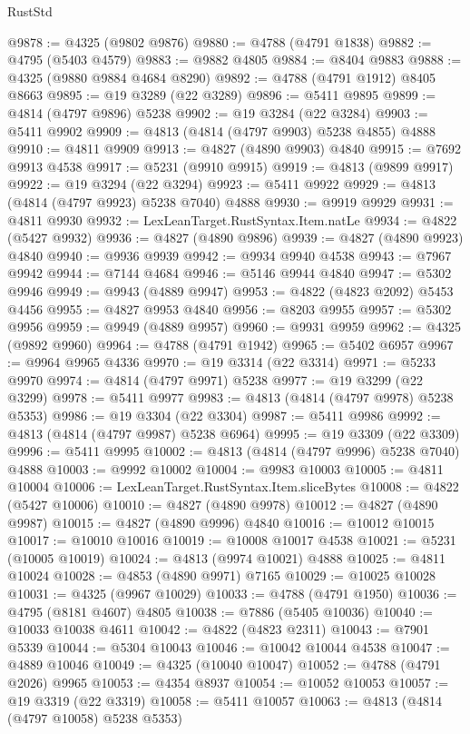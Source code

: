 \begin{lexlean}{RustStd}
\begin{coremodule}
@9878 := @4325 (@9802 @9876)
@9880 := @4788 (@4791 @1838)
@9882 := @4795 (@5403 @4579)
@9883 := @9882 @4805
@9884 := @8404 @9883
@9888 := @4325 (@9880 @9884 @4684 @8290)
@9892 := @4788 (@4791 @1912) @8405 @8663
@9895 := @19 @3289 (@22 @3289)
@9896 := @5411 @9895
@9899 := @4814 (@4797 @9896) @5238
@9902 := @19 @3284 (@22 @3284)
@9903 := @5411 @9902
@9909 := @4813 (@4814 (@4797 @9903) @5238 @4855) @4888
@9910 := @4811 @9909
@9913 := @4827 (@4890 @9903) @4840
@9915 := @7692 @9913 @4538
@9917 := @5231 (@9910 @9915)
@9919 := @4813 (@9899 @9917)
@9922 := @19 @3294 (@22 @3294)
@9923 := @5411 @9922
@9929 := @4813 (@4814 (@4797 @9923) @5238 @7040) @4888
@9930 := @9919 @9929
@9931 := @4811 @9930
@9932 := LexLeanTarget.RustSyntax.Item.natLe
@9934 := @4822 (@5427 @9932)
@9936 := @4827 (@4890 @9896)
@9939 := @4827 (@4890 @9923) @4840
@9940 := @9936 @9939
@9942 := @9934 @9940 @4538
@9943 := @7967 @9942
@9944 := @7144 @4684
@9946 := @5146 @9944 @4840
@9947 := @5302 @9946
@9949 := @9943 (@4889 @9947)
@9953 := @4822 (@4823 @2092) @5453 @4456
@9955 := @4827 @9953 @4840
@9956 := @8203 @9955
@9957 := @5302 @9956
@9959 := @9949 (@4889 @9957)
@9960 := @9931 @9959
@9962 := @4325 (@9892 @9960)
@9964 := @4788 (@4791 @1942)
@9965 := @5402 @6957
@9967 := @9964 @9965 @4336
@9970 := @19 @3314 (@22 @3314)
@9971 := @5233 @9970
@9974 := @4814 (@4797 @9971) @5238
@9977 := @19 @3299 (@22 @3299)
@9978 := @5411 @9977
@9983 := @4813 (@4814 (@4797 @9978) @5238 @5353)
@9986 := @19 @3304 (@22 @3304)
@9987 := @5411 @9986
@9992 := @4813 (@4814 (@4797 @9987) @5238 @6964)
@9995 := @19 @3309 (@22 @3309)
@9996 := @5411 @9995
@10002 := @4813 (@4814 (@4797 @9996) @5238 @7040) @4888
@10003 := @9992 @10002
@10004 := @9983 @10003
@10005 := @4811 @10004
@10006 := LexLeanTarget.RustSyntax.Item.sliceBytes
@10008 := @4822 (@5427 @10006)
@10010 := @4827 (@4890 @9978)
@10012 := @4827 (@4890 @9987)
@10015 := @4827 (@4890 @9996) @4840
@10016 := @10012 @10015
@10017 := @10010 @10016
@10019 := @10008 @10017 @4538
@10021 := @5231 (@10005 @10019)
@10024 := @4813 (@9974 @10021) @4888
@10025 := @4811 @10024
@10028 := @4853 (@4890 @9971) @7165
@10029 := @10025 @10028
@10031 := @4325 (@9967 @10029)
@10033 := @4788 (@4791 @1950)
@10036 := @4795 (@8181 @4607) @4805
@10038 := @7886 (@5405 @10036)
@10040 := @10033 @10038 @4611
@10042 := @4822 (@4823 @2311)
@10043 := @7901 @5339
@10044 := @5304 @10043
@10046 := @10042 @10044 @4538
@10047 := @4889 @10046
@10049 := @4325 (@10040 @10047)
@10052 := @4788 (@4791 @2026) @9965
@10053 := @4354 @8937
@10054 := @10052 @10053
@10057 := @19 @3319 (@22 @3319)
@10058 := @5411 @10057
@10063 := @4813 (@4814 (@4797 @10058) @5238 @5353)

\end{coremodule}
\end{lexlean}
